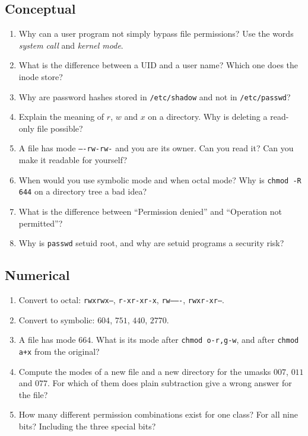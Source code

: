 \documentclass[11pt,a4paper]{article}
\newcommand{\cmd}[1]{\texttt{#1}}
\begin{document}
\subsection*{Conceptual}
\begin{enumerate}[leftmargin=1.6em]
  \item Why can a user program not simply bypass file permissions? Use the words \emph{system call} and \emph{kernel mode}.
  \item What is the difference between a UID and a user name? Which one does the inode store?
  \item Why are password hashes stored in \texttt{/etc/shadow} and not in \texttt{/etc/passwd}?
  \item Explain the meaning of $r$, $w$ and $x$ on a directory. Why is deleting a read-only file possible?
  \item A file has mode \texttt{----rw-rw-} and you are its owner. Can you read it? Can you make it readable for yourself?
  \item When would you use symbolic mode and when octal mode? Why is \texttt{chmod -R 644} on a directory tree a bad idea?
  \item What is the difference between ``Permission denied'' and ``Operation not permitted''?
  \item Why is \cmd{passwd} setuid root, and why are setuid programs a security risk?
\end{enumerate}

\subsection*{Numerical}
\begin{enumerate}[leftmargin=1.6em,resume]
  \item Convert to octal: \texttt{rwxrwx---}, \texttt{r-xr-xr-x}, \texttt{rw-------}, \texttt{rwxr-xr--}.
  \item Convert to symbolic: $604$, $751$, $440$, $2770$.
  \item A file has mode $664$. What is its mode after \texttt{chmod o-r,g-w}, and after \texttt{chmod a+x} from the original?
  \item Compute the modes of a new file and a new directory for the umasks $007$, $011$ and $077$. For which of them does plain subtraction give a wrong answer for the file?
  \item How many different permission combinations exist for one class? For all nine bits? Including the three special bits?
\end{enumerate}
\end{document}
